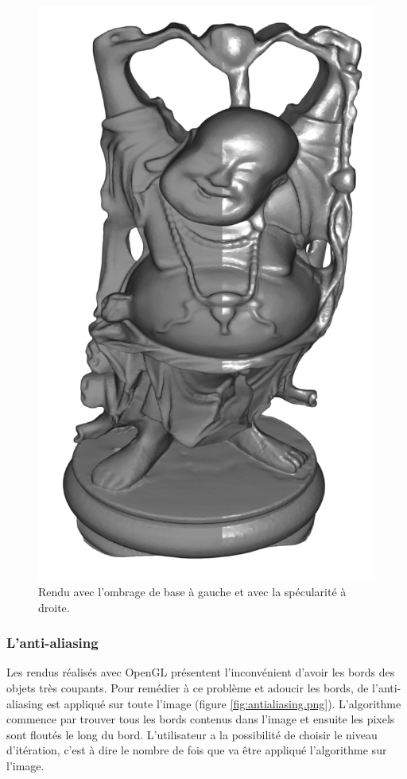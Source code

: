 \begin{figure}[h!]
	\centering
	\includegraphics[scale=0.23]{images/rendu_specular.png}
	\caption{\label{fig:screenSpecular.png} Rendu avec l'ombrage de base à gauche et avec la spécularité à droite. \protect}
\end{figure}

\subsubsection{L'anti-aliasing}
Les rendus réalisés avec OpenGL présentent l'inconvénient d'avoir les bords des objets très coupants. Pour remédier à ce problème et adoucir les bords, de l'anti-aliasing est appliqué sur toute l'image (figure \ref{fig:antialiasing.png}). L'algorithme commence par trouver tous les bords contenus dans l'image et ensuite les pixels sont floutés le long du bord.
L'utilisateur a la possibilité de choisir le niveau d'itération, c'est à dire le nombre de fois que va être appliqué l'algorithme sur l'image.

